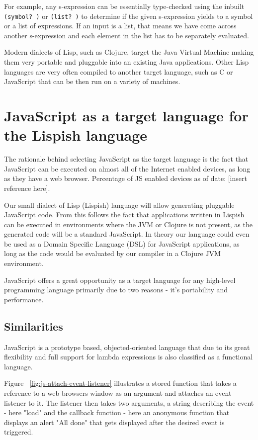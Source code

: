 For example, any s-expression can be essentially type-checked using the inbuilt \texttt{(symbol? )} or \texttt{(list? )} to determine if the given s-expression yields to a symbol or a list of expressions. If an input is a list, that means we have come across another s-expression and each element in the list has to be separately evaluated.

Modern dialects of Lisp, such as Clojure, target the Java Virtual Machine making them very portable and pluggable into an existing Java applications.
Other Lisp languages are very often compiled to another target language, such as C or JavaScript that can be then run on a variety of machines.

\section{JavaScript as a target language for the Lispish language}
The rationale behind selecting JavaScript as the target language is the fact that JavaScript can be executed on almost all of the Internet enabled devices, as long as they have a web browser. Percentage of JS enabled devices as of date: [insert reference here].

Our small dialect of Lisp (Lispish) language will allow generating pluggable JavaScript code.
From this follows the fact that applications written in Lispish can be executed in environments where the JVM or Clojure is not present, as the generated code will be a standard JavaScript.
In theory our language could even be used as a Domain Specific Language (DSL) for JavaScript applications, as long as the code would be evaluated by our compiler in a Clojure JVM environment.

JavaScript offers a great opportunity as a target language for any high-level programming language primarily due to two reasons - it's portability and performance.

\subsection{Similarities}
JavaScript is a prototype based, objected-oriented language that due to its great flexibility and full support for lambda expressions is also classified as a functional language.



Figure ~\ref{fig:js-attach-event-listener}  illustrates a stored function that takes a reference to a web browsers window as an argument and attaches an event listener to it. The listener then takes two arguments, a string describing the event - here "load" and the callback function - here an anonymous function that displays an alert "All done" that gets displayed after the desired event is triggered.


